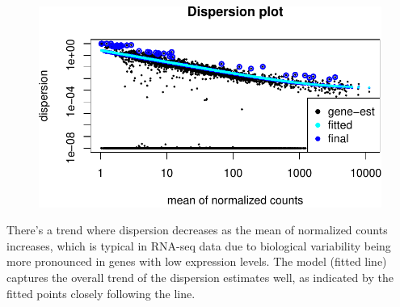 \documentclass[
  letterpaper,
  DIV=11,
  numbers=noendperiod]{scrartcl}
\begin{document}
\begin{figure}[H]

{\centering \includegraphics{intro-STAT-GroupProject_files/figure-pdf/unnamed-chunk-11-1.pdf}

}

\end{figure}

There's a trend where dispersion decreases as the mean of normalized
counts increases, which is typical in RNA-seq data due to biological
variability being more pronounced in genes with low expression levels.
The model (fitted line) captures the overall trend of the dispersion
estimates well, as indicated by the fitted points closely following the
line.
\end{document}
